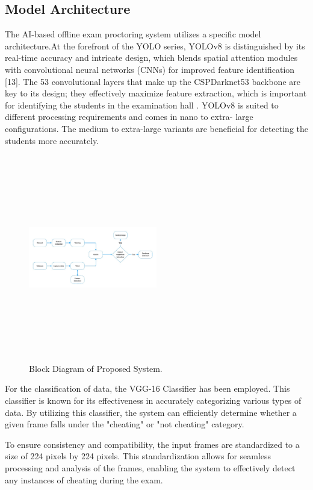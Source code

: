 \documentclass[conference]{IEEEtran}
\begin{document}
\subsection{Model Architecture}
The AI-based offline exam proctoring system utilizes a specific model architecture.At the forefront of the YOLO series, YOLOv8 is distinguished by its real-time accuracy and intricate design, which blends spatial attention modules with convolutional neural networks (CNNs) for improved feature identification [13]. The 53 convolutional layers that make up the CSPDarknet53 backbone are key to its design; they effectively maximize feature extraction, which is important for identifying the students in the examination hall . YOLOv8 is suited to different processing requirements and comes in nano to extra- large configurations. The medium to extra-large variants are beneficial for detecting the students more accurately.
\usepackage{graphicx} %

\begin{figure}[htbp]
\centering
\includegraphics[width=0.5\textwidth, height=9cm]{images/ARC.jpeg}  %
\caption{Block Diagram of Proposed System.}
\label{fig}
\end{figure}

For the classification of data, the VGG-16 Classifier has been employed. This classifier is known for its effectiveness in accurately categorizing various types of data. By utilizing this classifier, the system can efficiently determine whether a given frame falls under the "cheating" or "not cheating" category.

To ensure consistency and compatibility, the input frames are standardized to a size of 224 pixels by 224 pixels. This standardization allows for seamless processing and analysis of the frames, enabling the system to effectively detect any instances of cheating during the exam.
\end{document}
